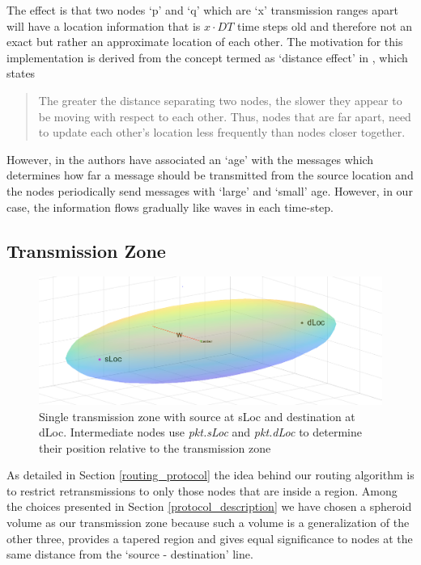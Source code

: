 The effect is that two nodes `p' and `q' which are `x' transmission ranges apart will have a location information that is $x \cdot DT $ time steps old and therefore not an exact but rather an approximate location of each other. The motivation for this implementation is derived from the concept termed as `distance effect' in \cite{Basagni:1998:DRE:288235.288254}, which states
\begin{quotation}
The greater the distance separating two nodes, the slower they appear to be moving with respect to each other. Thus, nodes that are far apart, need to update each other's location less frequently than nodes closer together.
\end{quotation}
However, in \cite{Basagni:1998:DRE:288235.288254} the authors have associated an `age' with the messages which determines how far a message should be transmitted from the source location and the nodes periodically send messages with `large' and `small' age. However, in our case, the information flows gradually like waves in each time-step.

\subsection{Transmission Zone}
\label{transmission_zone}
\begin{figure}[hbtp]
\centering
\includegraphics[width=1\textwidth]{Chapter-4/figs/Spheroid}
\caption{Single transmission zone with source at sLoc and destination at dLoc. Intermediate nodes use \emph{pkt.sLoc} and \emph{pkt.dLoc} to determine their position relative to the transmission zone}
\label{fig:spheroid}
\end{figure}

As detailed in Section \ref{routing_protocol} the idea behind our routing algorithm is to restrict retransmissions to only those nodes that are inside a region. Among the choices presented in Section \ref{protocol_description} we have chosen a spheroid volume as our transmission zone because such a volume is a generalization of the other three, provides a tapered region and gives equal significance to nodes at the same distance from the `source - destination' line. 

